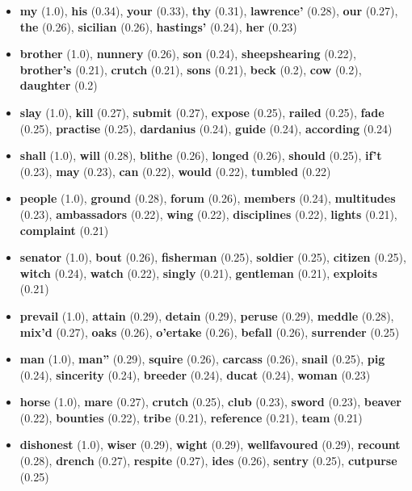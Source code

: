 \documentclass[answers]{exam}
\begin{document}
\begin{questions}
\begin{parts}
\begin{solution}
\begin{itemize}
\item \textbf{my} (1.0), \textbf{his} (0.34), \textbf{your} (0.33), \textbf{thy}
    (0.31), \textbf{lawrence’} (0.28), \textbf{our} (0.27), \textbf{the} (0.26),
    \textbf{sicilian} (0.26), \textbf{hastings’} (0.24), \textbf{her} (0.23)
\item \textbf{brother} (1.0), \textbf{nunnery} (0.26), \textbf{son} (0.24),
    \textbf{sheepshearing} (0.22), \textbf{brother’s} (0.21), \textbf{crutch}
    (0.21), \textbf{sons} (0.21), \textbf{beck} (0.2), \textbf{cow} (0.2),
    \textbf{daughter} (0.2)
\item \textbf{slay} (1.0), \textbf{kill} (0.27), \textbf{submit} (0.27),
    \textbf{expose} (0.25), \textbf{railed} (0.25), \textbf{fade} (0.25),
    \textbf{practise} (0.25), \textbf{dardanius} (0.24), \textbf{guide} (0.24),
    \textbf{according} (0.24)
\item \textbf{shall} (1.0), \textbf{will} (0.28), \textbf{blithe} (0.26),
    \textbf{longed} (0.26), \textbf{should} (0.25), \textbf{if’t} (0.23),
    \textbf{may} (0.23), \textbf{can} (0.22), \textbf{would} (0.22),
    \textbf{tumbled} (0.22)
\item \textbf{people} (1.0), \textbf{ground} (0.28), \textbf{forum} (0.26),
    \textbf{members} (0.24), \textbf{multitudes} (0.23), \textbf{ambassadors}
    (0.22), \textbf{wing} (0.22), \textbf{disciplines} (0.22), \textbf{lights}
    (0.21), \textbf{complaint} (0.21)
\item \textbf{senator} (1.0), \textbf{bout} (0.26), \textbf{fisherman} (0.25),
    \textbf{soldier} (0.25), \textbf{citizen} (0.25), \textbf{witch} (0.24),
    \textbf{watch} (0.22), \textbf{singly} (0.21), \textbf{gentleman} (0.21),
    \textbf{exploits} (0.21)
\item \textbf{prevail} (1.0), \textbf{attain} (0.29), \textbf{detain} (0.29),
    \textbf{peruse} (0.29), \textbf{meddle} (0.28), \textbf{mix’d} (0.27),
    \textbf{oaks} (0.26), \textbf{o’ertake} (0.26), \textbf{befall} (0.26),
    \textbf{surrender} (0.25)
\item \textbf{man} (1.0), \textbf{man”} (0.29), \textbf{squire} (0.26),
    \textbf{carcass} (0.26), \textbf{snail} (0.25), \textbf{pig} (0.24),
    \textbf{sincerity} (0.24), \textbf{breeder} (0.24), \textbf{ducat} (0.24),
    \textbf{woman} (0.23)
\item \textbf{horse} (1.0), \textbf{mare} (0.27), \textbf{crutch} (0.25),
    \textbf{club} (0.23), \textbf{sword} (0.23), \textbf{beaver} (0.22),
    \textbf{bounties} (0.22), \textbf{tribe} (0.21), \textbf{reference} (0.21),
    \textbf{team} (0.21)
\item \textbf{dishonest} (1.0), \textbf{wiser} (0.29), \textbf{wight} (0.29),
    \textbf{wellfavoured} (0.29), \textbf{recount} (0.28), \textbf{drench}
    (0.27), \textbf{respite} (0.27), \textbf{ides} (0.26), \textbf{sentry}
    (0.25), \textbf{cutpurse} (0.25)
\end{itemize}
\end{solution}
\end{parts}

\end{questions}
\end{document}
